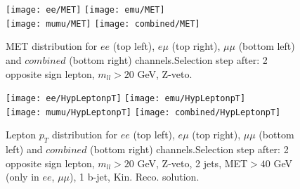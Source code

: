 



\begin{figure}
  \texttt{[image: ee/MET]}
  \texttt{[image: emu/MET]}\\
  \texttt{[image: mumu/MET]}
  \texttt{[image: combined/MET]}
\caption{MET distribution for $ee$ (top left), $e\mu$ (top right), $\mu\mu$ (bottom left) and $combined$ (bottom right) channels.\newline Selection step after: 2 opposite sign lepton, $m_{ll}>20$ GeV, Z-veto.}
\end{figure}

\clearpage
\newpage



\begin{figure}
  \texttt{[image: ee/HypLeptonpT]}
  \texttt{[image: emu/HypLeptonpT]}\\
  \texttt{[image: mumu/HypLeptonpT]}
  \texttt{[image: combined/HypLeptonpT]}
\caption{Lepton $p_T$ distribution for $ee$ (top left), $e\mu$ (top right), $\mu\mu$ (bottom left) and $combined$ (bottom right) channels.\newline Selection step after: 2 opposite sign lepton, $m_{ll}>20$ GeV, Z-veto, 2 jets, MET$>40$ GeV (only in $ee$, $\mu\mu$), 1 b-jet, Kin. Reco. solution.}
\end{figure}

